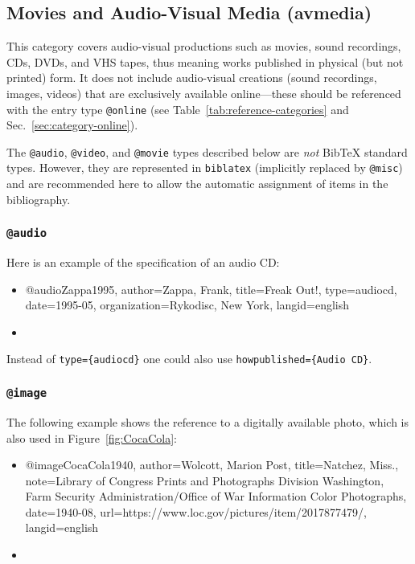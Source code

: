 \subsection{Movies and Audio-Visual Media (\textsf{avmedia})}
\label{sec:category-avmedia}

This category covers audio-visual productions such as movies, sound recordings,
CDs, DVDs, and VHS tapes, thus meaning works published in physical (but not
printed) form. It does not include audio-visual creations (sound recordings,
images, videos) that are exclusively available online---these should be
referenced with the entry type \texttt{@online} (see
Table~\ref{tab:reference-categories} and Sec.~\ref{sec:category-online}).

The \texttt{@audio}, \texttt{@video}, and \texttt{@movie} types described below
are \emph{not} BibTeX standard types. However, they are represented in
\texttt{biblatex} (implicitly replaced by \texttt{@misc}) and are recommended
here to allow the automatic assignment of items in the bibliography.

\subsubsection{\texttt{\bfseries @audio}}
\label{sec:@audio}
Here is an example of the specification of an audio CD:
%
\begin{itemize}
\item[]
\begin{GenericCode}[numbers=none]
@audio{Zappa1995,
  author={Zappa, Frank},
  title={Freak Out!},
  type={audiocd},
  date={1995-05},
  organization={Rykodisc, New York},
  langid={english}
}
\end{GenericCode}
\item[\cite{Zappa1995}] 
\end{itemize}
%
Instead of \verb!type={audiocd}! one could also use \verb!howpublished={Audio CD}!.

\subsubsection{\texttt{\bfseries @image}}
\label{sec:@image}

The following example shows the reference to a digitally available photo, which
is also used in Figure~\ref{fig:CocaCola}:
%
\begin{itemize}
\item[]
\begin{GenericCode}[numbers=none]
@image{CocaCola1940,
  author={Wolcott, Marion Post},
  title={Natchez, Miss.},
  note={Library of Congress Prints and Photographs Division Washington, Farm Security Administration/Office of War Information Color Photographs},
  date={1940-08},
  url={https://www.loc.gov/pictures/item/2017877479/},
  langid={english}
}
\end{GenericCode}
\item[\cite{CocaCola1940}] 
\end{itemize}

